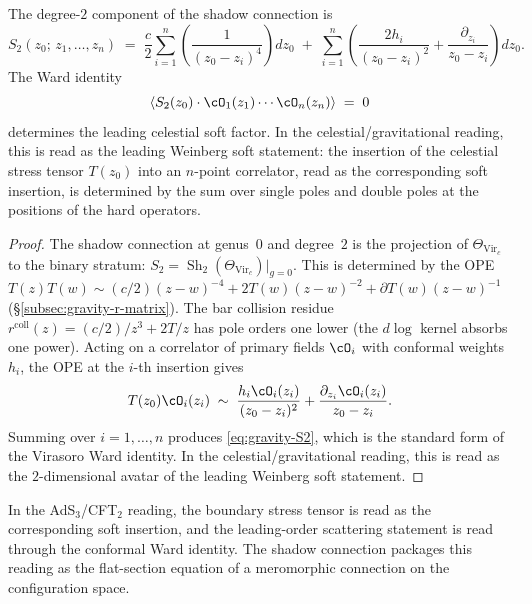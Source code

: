 \begin{theorem}
\label{thm:gravity-weinberg-soft}
The degree-$2$ component of the shadow connection is
\begin{equation}\label{eq:gravity-S2}
S_2(z_0;\, z_1, \ldots, z_n)
\;=\;
\frac{c}{2}\sum_{i=1}^n
\left(
 \frac{1}{(z_0 - z_i)^4}
\right)
dz_0
\;+\;
\sum_{i=1}^n
\left(
 \frac{2h_i}{(z_0 - z_i)^2}
 + \frac{\partial_{z_i}}{z_0 - z_i}
\right)
dz_0.
\end{equation}
The Ward identity
\[
\left\langle
 S_2(z_0)\cdot
 \cO_1(z_1)\cdots\cO_n(z_n)
\right\rangle
\;=\; 0
\]
determines the leading celestial soft factor. In the
celestial/gravitational reading, this is read as the leading
Weinberg soft statement: the insertion of the celestial stress tensor
$T(z_0)$ into an $n$-point correlator, read as the corresponding soft
insertion, is determined by the sum over single
poles and double poles at the positions of the hard operators.
\end{theorem}

\begin{proof}
The shadow connection at genus~$0$ and degree~$2$ is the
projection of $\Theta_{\mathrm{Vir}_c}$ to the binary stratum:
$S_2 = \operatorname{Sh}_2(\Theta_{\mathrm{Vir}_c})|_{g=0}$.
This is determined by the OPE
$T(z)T(w) \sim (c/2)(z{-}w)^{-4} + 2T(w)(z{-}w)^{-2}
+ \partial T(w)(z{-}w)^{-1}$
(\S\ref{subsec:gravity-r-matrix}). The bar collision residue
$r^{\mathrm{coll}}(z) = (c/2)/z^3 + 2T/z$ has pole orders
one lower (the $d\log$ kernel absorbs one power).
Acting on a correlator of primary fields $\cO_i$ with conformal
weights $h_i$, the OPE at the $i$-th insertion gives
\[
T(z_0)\cO_i(z_i)
\;\sim\;
\frac{h_i\cO_i(z_i)}{(z_0 - z_i)^2}
+ \frac{\partial_{z_i}\cO_i(z_i)}{z_0 - z_i}.
\]
Summing over $i = 1, \ldots, n$ produces
\eqref{eq:gravity-S2}, which is the standard form of the
Virasoro Ward identity. In the celestial/gravitational reading,
this is read as the $2$-dimensional avatar of the leading Weinberg soft
statement.
\end{proof}

In the AdS$_3$/CFT$_2$ reading, the boundary stress tensor is read
as the corresponding soft insertion, and the leading-order scattering statement is
read through the conformal Ward identity. The shadow connection
packages this reading as the flat-section equation of a meromorphic
connection on the configuration space.

